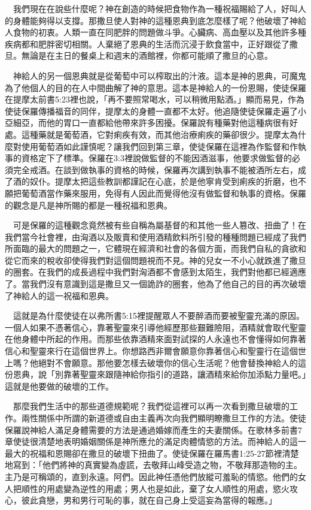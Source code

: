 \documentclass{book}
\begin{document}
　我們現在在說些什麼呢？神在創造的時候把食物作為一種祝福賜給了人，好叫人的身體能夠得以支撐。那撒旦使人對神的這種恩典到底怎麼樣了呢？他破壞了神給人食物的初衷。人類一直在同肥胖的問題做斗爭。心臟病、高血壓以及其他許多種疾病都和肥胖密切相關。人棄絕了恩典的生活而沉浸于飲食當中，正好跟從了撒旦。無論是在主日的餐桌上和週末的酒館裡，你都可能順了撒旦的心意。

　神給人的另一個恩典就是從葡萄中可以榨取出的汁液。這本是神的恩典，可魔鬼為了他個人的目的在人中間曲解了神的意思。這本是神給人的一份恩賜，使徒保羅在提摩太前書5:23裡也說，「再不要照常喝水，可以稍微用點酒。」顯而易見，作為使徒保羅傳播福音的同伴，提摩太的身體一直都不太好。他追隨使徒保羅走遍了小亞細亞，而他的胃口一直都給他帶來許多困擾。保羅說有種藥對他這種病很有好處。這種藥就是葡萄酒，它對痢疾有效，而其他治療痢疾的藥卻很少。提摩太為什麼對使用葡萄酒如此謹慎呢？讓我們回到第三章，使徒保羅在這裡為作監督和作執事的資格定下了標準。保羅在3:3裡說做監督的不能因酒滋事，他要求做監督的必須完全戒酒。在談到做執事的資格的時候，保羅再次講到執事不能被酒所左右，成了酒的奴仆。提摩太把這些教訓都謹記在心底，於是他寧肯受到痢疾的折磨，也不願把葡萄酒當作藥來服用，免得有人因此而覺得他沒有做監督和執事的資格。保羅的觀念是凡是神所賜的都是一種祝福和恩典。

　可是保羅的這種觀念竟然被有些自稱為屬基督的和其他一些人篡改、扭曲了！在我們當今社會裡，由洶酒以及販賣和使用酒精飲料所引發的種種問題已經成了我們所面臨的最大的問題之一，它體現在經濟和社會的各個方面，而我們自私的貪欲和從它而來的稅收卻使得我們對這個問題視而不見。神的兒女一不小心就跌進了撒旦的圈套。在我們的成長過程中我們對洶酒都不會感到太陌生，我們對他都已經適應了。當我們沒有意識到這是撒旦又一個詭詐的圈套，他為了他自己的目的再次破壞了神給人的這一祝福和恩典。

　這就是為什麼使徒在以弗所書5:15裡提醒眾人不要醉酒而要被聖靈充滿的原因。一個人如果不憑著信心，靠著聖靈來引導他經歷那些艱難險阻，酒精就會取代聖靈在他身體中所起的作用。而那些依靠酒精來面對試探的人永遠也不會懂得如何靠著信心和聖靈來行在這個世界上。你想路西非爾會願意你靠著信心和聖靈行在這個世上嗎？他絕對不會願意。那他要怎樣去破壞你的信心生活呢？他會替換神給人的這份恩典，說「別靠著聖靈來跟隨神給你指引的道路，讓酒精來給你加添點力量吧。」這就是他要做的破壞的工作。

　那麼我們生活中的那些道德規範呢？我們從這裡可以再一次看到撒旦破壞的工作。兩性關係中所謂的新道德或自由主義再次向我們顯明瞭撒旦工作的方法。使徒保羅說神給人滿足身體需要的方法是通過婚嫁而產生的夫妻關係。在歌林多前書7章使徒很清楚地表明婚姻關係是神所應允的滿足肉體情慾的方法。而神給人的這一最大的祝福和恩賜卻在撒旦的破壞下扭曲了。使徒保羅在羅馬書1:25-27節裡清楚地寫到：「他們將神的真實變為虛謊，去敬拜山峰受造之物，不敬拜那造物的主。主乃是可稱頌的，直到永遠。阿們。因此神任憑他們放縱可羞恥的情慾。他們的女人把順性的用處變為逆性的用處；男人也是如此，棄了女人順性的用處，慾火攻心，彼此貪戀，男和男行可恥的事，就在自己身上受這妄為當得的報應。」
\end{document}
